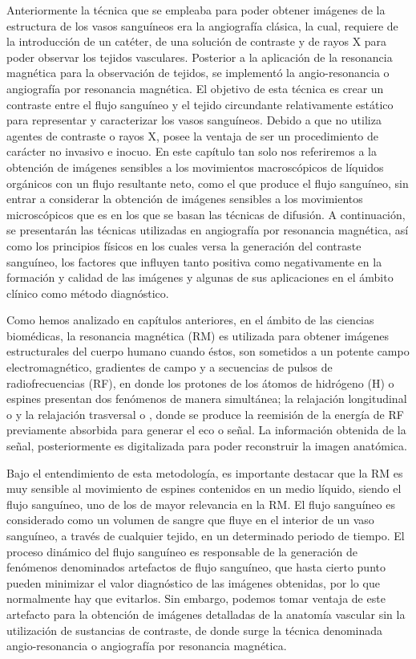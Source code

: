 

Anteriormente la técnica que se empleaba para poder obtener imágenes de la estructura de los vasos sanguíneos era la angiografía clásica, la cual, requiere de la introducción de un catéter, de una solución de contraste y de rayos X para poder observar los tejidos vasculares. Posterior a la aplicación de la resonancia magnética para la observación de tejidos, se implementó la angio-resonancia o angiografía por resonancia magnética. El objetivo de esta técnica es crear un contraste entre el flujo sanguíneo y el tejido circundante relativamente estático para representar y caracterizar los vasos sanguíneos. Debido a que no utiliza agentes de contraste o rayos X, posee la ventaja de ser un procedimiento de carácter no invasivo e inocuo. En este capítulo tan solo nos referiremos a la obtención de imágenes sensibles a los movimientos macroscópicos de líquidos orgánicos con un flujo resultante neto, como el que produce el flujo sanguíneo, sin entrar a considerar la obtención de imágenes sensibles a los movimientos microscópicos que es en los que se basan las técnicas de difusión. A continuación, se presentarán las técnicas utilizadas en angiografía por resonancia magnética, así como los principios físicos en los cuales versa la generación del contraste sanguíneo, los factores que influyen tanto positiva como negativamente en la formación y calidad de las imágenes y algunas de sus aplicaciones en el ámbito clínico como método diagnóstico.



Como hemos analizado en capítulos anteriores, en el ámbito de las ciencias biomédicas, la resonancia magnética (RM) es utilizada para obtener imágenes estructurales del cuerpo humano cuando éstos, son sometidos a un potente campo electromagnético, gradientes de campo y a secuencias de pulsos de radiofrecuencias (RF), en donde los protones de los átomos de hidrógeno (H) o espines presentan dos fenómenos de manera simultánea; la relajación longitudinal o \Tone y la relajación trasversal o \Ttwo, donde se produce la reemisión de la energía de RF previamente absorbida para generar el eco o señal. La información obtenida de la señal, posteriormente es digitalizada para poder reconstruir la imagen anatómica.

Bajo el entendimiento de esta metodología, es importante destacar que la RM es muy sensible al movimiento de espines contenidos en un medio líquido, siendo el flujo sanguíneo, uno de los de mayor relevancia en la RM. El flujo sanguíneo es considerado como un volumen de sangre que fluye en el interior de un vaso sanguíneo, a través de cualquier tejido, en un determinado periodo de tiempo. El proceso dinámico del flujo sanguíneo es responsable de la generación de fenómenos denominados artefactos de flujo sanguíneo, que hasta cierto punto pueden minimizar el valor diagnóstico de las imágenes obtenidas, por lo que normalmente hay que evitarlos. Sin embargo, podemos tomar ventaja de este artefacto para la obtención de imágenes detalladas de la anatomía vascular sin la utilización de sustancias de contraste, de donde surge la técnica denominada angio-resonancia o angiografía por resonancia magnética. 

